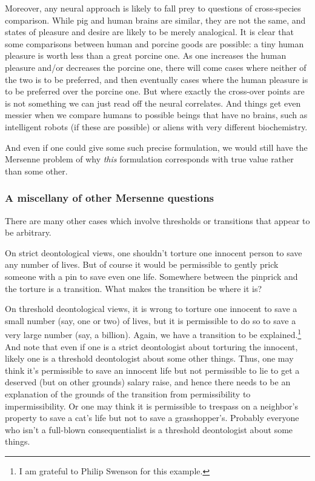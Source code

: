 Moreover, any neural approach is likely to fall prey to questions of cross-species comparison. While pig and human brains are
similar, they are not the same, and states of pleasure and desire are likely to be merely analogical. It is clear that some
comparisons between human and porcine goods are possible: a tiny human pleasure is worth less than a great porcine one. As one
increases the human pleasure and/or decreases the porcine one, there will come cases where neither of the two is to be
preferred, and then eventually cases where the human pleasure is to be preferred over the porcine one. But where exactly
the cross-over points are is not something we can just read off the neural correlates. And things get even messier when we
compare humans to possible beings that have no brains, such as intelligent robots (if these are possible) or aliens with very 
different biochemistry.

And even if one could give some such precise formulation, we would still have
the Mersenne problem of why \textit{this} formulation corresponds with true value rather than some other. 

\subsubsection{A miscellany of other Mersenne questions}
There are many other cases which involve thresholds or transitions that appear to be arbitrary.

On strict deontological views, one shouldn't torture one innocent person to save any number of lives. But of course
it would be permissible to gently prick someone with a pin to save even one life. Somewhere between the pinprick
and the torture is a transition. What makes the transition be where it is?

On threshold deontological views, it is wrong to torture one innocent to save a small number (say, one or two) of lives,
but it is permissible to do so to save a very large number (say, a billion). Again, we have a transition to be 
explained.\footnote{I am grateful to Philip Swenson for this example.} And note that even if one is a strict deontologist
about torturing the innocent, likely one is a threshold deontologist about some other things. Thus, one may think it's
permissible to save an innocent life but not permissible to lie to get a deserved (but on other grounds) salary raise,
and hence there needs to be an explanation of the grounds of the transition from permissibility to impermissibility. Or
one may think it is permissible to trespass on a neighbor's property to save a cat's life but not to save a grasshopper's.
Probably everyone who isn't a full-blown consequentialist is a threshold deontologist about some things.

